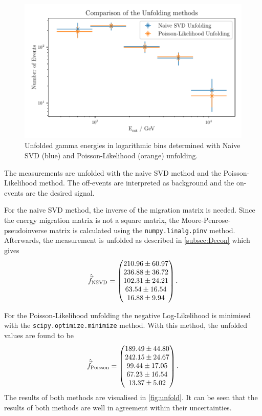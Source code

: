 \begin{figure}[tb]
  \centering
  \includegraphics[width=.7\textwidth]{plots/Unfolding_compare.pdf}
  \caption{Unfolded gamma energies in logarithmic bins determined with Naive SVD (blue) and Poisson-Likelihood (orange) unfolding.}
  \label{fig:unfold}
\end{figure}

The measurements are unfolded with the naive SVD method and the Poisson-Likelihood method. The off-events are interpreted as background and the on-events are the desired signal.

For the naive SVD method, the inverse of the migration matrix is needed. Since the energy migration matrix is not a square matrix, the Moore-Penrose-pseudoinverse matrix is calculated using the \texttt{numpy.linalg.pinv} method. Afterwards, the measurement is unfolded as described in \autoref{subsec:Decon} which gives
\begin{equation}
  \hat{\vec{f}}_\mathrm{NSVD} = \begin{pmatrix} \num{210.96 \pm 60.97} \\ \num{236.88 \pm 36.72} \\ \num{102.31 \pm 24.21} \\ \num{63.54 \pm 16.54} \\ \num{16.88 \pm 9.94} \end{pmatrix}.
\end{equation}


For the Poisson-Likelihood unfolding the negative Log-Likelihood is minimised with the \texttt{scipy.optimize.minimize} method. With this method, the unfolded values are found to be
\begin{equation}
  \hat{\vec{f}}_\mathrm{Poisson} = \begin{pmatrix} \num{189.49 \pm 44.80} \\ \num{242.15 \pm 24.67} \\ \num{99.44 \pm 17.05} \\ \num{67.23 \pm 16.54} \\ \num{13.37 \pm 5.02} \end{pmatrix}.
\end{equation}
The results of both methods are visualised in \autoref{fig:unfold}. It can be seen that the results of both methods are well in agreement within their uncertainties.


